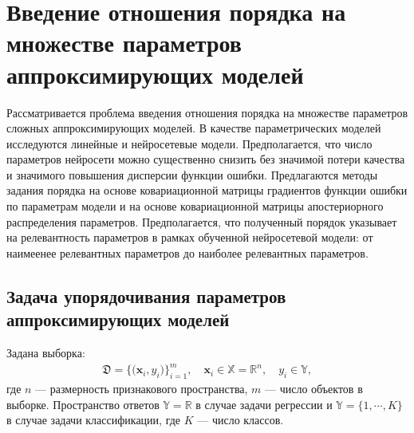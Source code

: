 \chapter{Введение отношения порядка на множестве параметров аппроксимирующих моделей}

Рассматривается проблема введения отношения порядка на множестве параметров сложных аппроксимирующих моделей.
В качестве параметрических моделей исследуются линейные и нейросетевые модели.
Предполагается, что число параметров нейросети можно существенно снизить без значимой потери качества и значимого повышения дисперсии функции ошибки.
Предлагаются методы задания порядка на основе ковариационной матрицы градиентов функции ошибки по параметрам модели и на основе ковариационной матрицы апостериорного распределения параметров.
Предполагается, что полученный порядок указывает на релевантность параметров в рамках обученной нейросетевой модели: от наимеенее релевантных параметров до наиболее релевантных параметров.

\section{Задача упорядочивания параметров аппроксимирующих моделей}
Задана выборка:
\[
\label{eq:st:1}
\begin{aligned}
\mathfrak{D} = \bigr\{\bigr(\textbf{x}_i, y_i\bigr)\bigr\}_{i=1}^{m}, \quad \textbf{x}_{i} \in \mathbb{X} = \mathbb{R}^{n}, \quad y_i \in \mathbb{Y},
\end{aligned}
\]
где $n$ --- размерность признакового пространства, $m$ --- число объектов в выборке. Пространство ответов $\mathbb{Y} = \mathbb{R}$ в случае задачи регрессии и  $\mathbb{Y} = \{1,\cdots, K\}$ в случае задачи классификации, где $K$ --- число классов.

